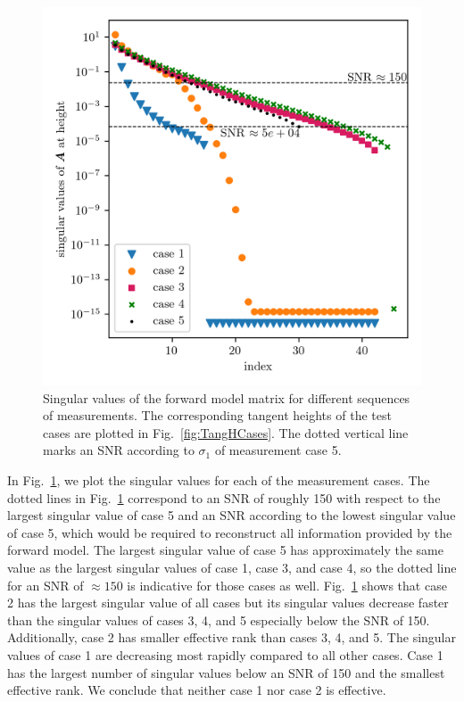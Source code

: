 \begin{figure}[ht!]
	\centering
	\includegraphics{SingValA.png}
	\caption[Singular values of linear forward model matrix for different sequences of measurements.]{Singular values of the forward model matrix for different sequences of measurements.
	The corresponding tangent heights of the test cases are plotted in Fig.~\ref{fig:TangHCases}. The dotted vertical line marks an SNR according to $\sigma_1$ of measurement case 5.}
\label{fig:SingA}
\end{figure}
In Fig.~\ref{fig:SingA}, we plot the singular values for each of the measurement cases.
The dotted lines in Fig.~\ref{fig:SingA} correspond to an SNR of roughly 150 with respect to the largest singular value of case 5 and an SNR according to the lowest singular value of case 5, which would be required to reconstruct all information provided by the forward model.
The largest singular value of case 5 has approximately the same value as the largest singular values of case 1, case 3, and case 4, so the dotted line for an SNR of $\approx 150$ is indicative for those cases as well.
Fig.~\ref{fig:SingA} shows that case 2 has the largest singular value of all cases but its singular values decrease faster than the singular values of cases 3, 4, and 5 especially below the SNR of 150.
Additionally, case 2 has smaller effective rank than cases 3, 4, and 5.
The singular values of case 1 are decreasing most rapidly compared to all other cases. Case 1 has the largest number of singular values below an SNR of 150 and the smallest effective rank.
We conclude that neither case 1 nor case 2 is effective.

